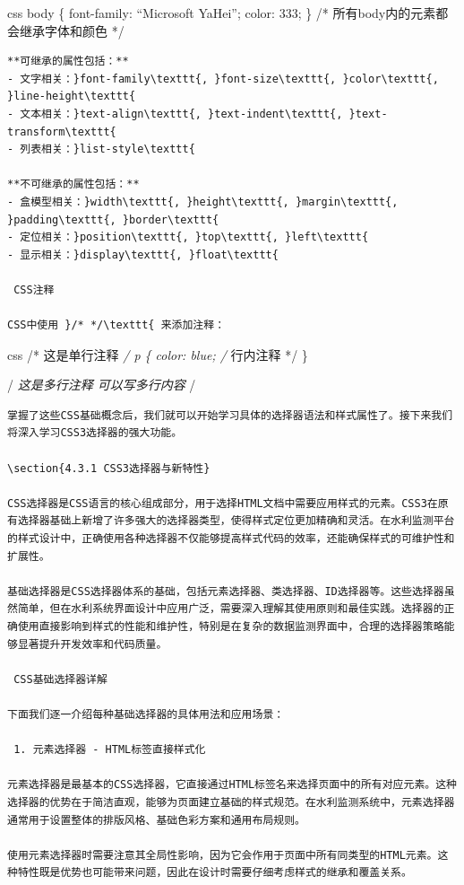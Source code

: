 css body \{ font-family: ``Microsoft YaHei''; color: 333; \} /* 所有body内的元素都会继承字体和颜色 */

\begin{lstlisting}
**可继承的属性包括：**
- 文字相关：}font-family\texttt{, }font-size\texttt{, }color\texttt{, }line-height\texttt{
- 文本相关：}text-align\texttt{, }text-indent\texttt{, }text-transform\texttt{
- 列表相关：}list-style\texttt{

**不可继承的属性包括：**
- 盒模型相关：}width\texttt{, }height\texttt{, }margin\texttt{, }padding\texttt{, }border\texttt{
- 定位相关：}position\texttt{, }top\texttt{, }left\texttt{
- 显示相关：}display\texttt{, }float\texttt{

 CSS注释

CSS中使用 }/* */\texttt{ 来添加注释：
\end{lstlisting}

css /* 这是单行注释 \emph{/ p \{ color: blue; /} 行内注释 */ \}

/\emph{ 这是多行注释 可以写多行内容 }/

\begin{lstlisting}
掌握了这些CSS基础概念后，我们就可以开始学习具体的选择器语法和样式属性了。接下来我们将深入学习CSS3选择器的强大功能。

\section{4.3.1 CSS3选择器与新特性}

CSS选择器是CSS语言的核心组成部分，用于选择HTML文档中需要应用样式的元素。CSS3在原有选择器基础上新增了许多强大的选择器类型，使得样式定位更加精确和灵活。在水利监测平台的样式设计中，正确使用各种选择器不仅能够提高样式代码的效率，还能确保样式的可维护性和扩展性。

基础选择器是CSS选择器体系的基础，包括元素选择器、类选择器、ID选择器等。这些选择器虽然简单，但在水利系统界面设计中应用广泛，需要深入理解其使用原则和最佳实践。选择器的正确使用直接影响到样式的性能和维护性，特别是在复杂的数据监测界面中，合理的选择器策略能够显著提升开发效率和代码质量。

 CSS基础选择器详解

下面我们逐一介绍每种基础选择器的具体用法和应用场景：

 1. 元素选择器 - HTML标签直接样式化

元素选择器是最基本的CSS选择器，它直接通过HTML标签名来选择页面中的所有对应元素。这种选择器的优势在于简洁直观，能够为页面建立基础的样式规范。在水利监测系统中，元素选择器通常用于设置整体的排版风格、基础色彩方案和通用布局规则。

使用元素选择器时需要注意其全局性影响，因为它会作用于页面中所有同类型的HTML元素。这种特性既是优势也可能带来问题，因此在设计时需要仔细考虑样式的继承和覆盖关系。
\end{lstlisting}

